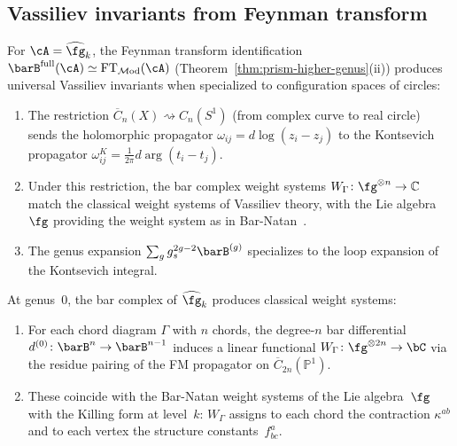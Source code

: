 \subsection{Vassiliev invariants from Feynman transform}
\label{subsec:vassiliev}

\begin{conjecture}\label{conj:vassiliev-bar}
For $\cA = \widehat{\fg}_k$, the Feynman transform identification
$\barB^{\mathrm{full}}(\cA) \simeq \mathrm{FT}_{\mathcal{M}\mathrm{od}}(\cA)$
\textup{(}Theorem~\textup{\ref{thm:prism-higher-genus}(ii))}
produces universal Vassiliev invariants when specialized to
configuration spaces of circles:
\begin{enumerate}[label=\textup{(\roman*)}]
\item The restriction
  $\overline{C}_n(X) \rightsquigarrow C_n(S^1)$
  \textup{(}from complex curve to real circle\textup{)} sends the
  holomorphic propagator $\omega_{ij} = d\log(z_i - z_j)$ to the
  Kontsevich propagator $\omega_{ij}^K = \frac{1}{2\pi} d\arg(t_i - t_j)$.
\item Under this restriction, the bar complex weight systems
  $W_\Gamma\colon \fg^{\otimes n} \to \mathbb{C}$ match the
  classical weight systems of Vassiliev theory, with the
  Lie algebra $\fg$ providing the weight system as in
  Bar-Natan~\cite{BarNatan95}.
\item The genus expansion
  $\sum_g g_s^{2g-2} \barB^{(g)}$ specializes to the
  loop expansion of the Kontsevich integral.
\end{enumerate}
\end{conjecture}

\begin{proposition}\label{prop:vassiliev-genus0}
At genus~$0$, the bar complex of $\widehat{\fg}_k$ produces
classical weight systems:
\begin{enumerate}[label=\textup{(\roman*)}]
\item For each chord diagram $\Gamma$ with $n$ chords, the
  degree-$n$ bar differential $d^{(0)}\colon \barB^n \to \barB^{n-1}$
  induces a linear functional
  $W_\Gamma\colon \fg^{\otimes 2n} \to \bC$ via the residue
  pairing of the FM propagator on $\overline{C}_{2n}(\mathbb{P}^1)$.
\item These coincide with the Bar-Natan weight systems of the
  Lie algebra~$\fg$ with the Killing form at level~$k$: $W_\Gamma$
  assigns to each chord the contraction $\kappa^{ab}$ and to each
  vertex the structure constants~$f^a_{bc}$.
\end{enumerate}
\end{proposition}

